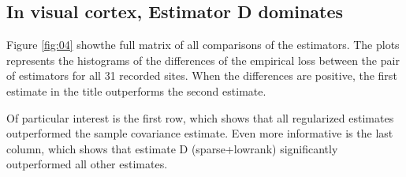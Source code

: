 \subsection*{In visual cortex, Estimator D dominates}

Figure \ref{fig:04} showthe full matrix of all comparisons of the estimators.  The plots represents the histograms of the differences of the empirical loss between the pair of estimators for all 31 recorded sites.  When the differences are positive, the first estimate in the title outperforms the second estimate.

Of particular interest is the first row, which shows that all regularized estimates  outperformed the sample covariance estimate.  Even more informative is the last column, which shows that estimate D (sparse+lowrank) significantly outperformed all other estimates.
